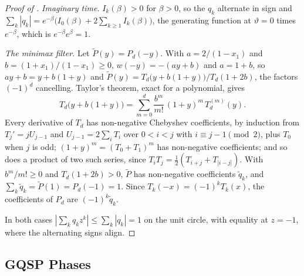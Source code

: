 \begin{proof}[Proof of ]
\emph{Imaginary time.} $I_k(\beta)>0$ for $\beta>0$, so the $q_k$ alternate in sign and $\sum_k|q_k|=e^{-\beta}\bigl(I_0(\beta)+2\sum_{k\ge1}I_k(\beta)\bigr)$, the generating function at $\vartheta=0$ times $e^{-\beta}$, which is $e^{-\beta}e^{\beta}=1$.

\emph{The minimax filter.} Let $\tilde P(y)=P_d(-y)$. With $a=2/(1-x_1)$ and $b=(1+x_1)/(1-x_1)\ge0$, $w(-y)=-(ay+b)$ and $a=1+b$, so $ay+b=y+b(1+y)$ and $\tilde P(y)=T_d\bigl(y+b(1+y)\bigr)/T_d(1+2b)$, the factors $(-1)^d$ cancelling. Taylor's theorem, exact for a polynomial, gives
\begin{equation*}
    T_d\bigl(y+b(1+y)\bigr)=\sum_{m=0}^{d}\frac{b^m}{m!}\,(1+y)^m\,T_d^{(m)}(y).
\end{equation*}
Every derivative of $T_d$ has non-negative Chebyshev coefficients, by induction from $T_j'=jU_{j-1}$ and $U_{j-1}=2\sum_iT_i$ over $0<i<j$ with $i\equiv j-1\pmod 2$, plus $T_0$ when $j$ is odd; $(1+y)^m=(T_0+T_1)^m$ has non-negative coefficients; and so does a product of two such series, since $T_iT_j=\tfrac12(T_{i+j}+T_{|i-j|})$. With $b^m/m!\ge0$ and $T_d(1+2b)>0$, $\tilde P$ has non-negative coefficients $\tilde q_k$, and $\sum_k\tilde q_k=\tilde P(1)=P_d(-1)=1$. Since $T_k(-x)=(-1)^kT_k(x)$, the coefficients of $P_d$ are $(-1)^k\tilde q_k$.

In both cases $|\sum_kq_kz^k|\le\sum_k|q_k|=1$ on the unit circle, with equality at $z=-1$, where the alternating signs align.
\end{proof}

\subsection{GQSP Phases}
\label{app:gqsp-phases}

